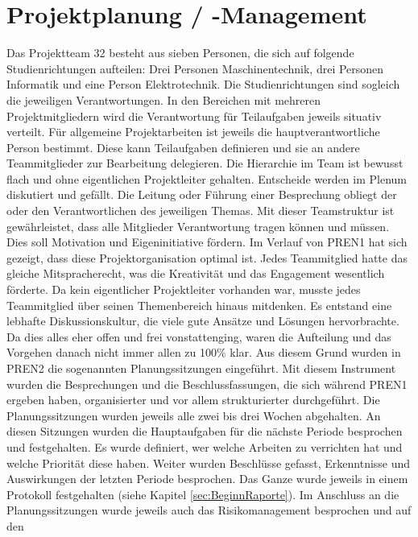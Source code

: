 \section{Projektplanung / -Management}

Das Projektteam 32 besteht aus sieben Personen, die sich auf folgende 
Studienrichtungen aufteilen: Drei Personen Maschinentechnik, drei 
Personen Informatik und eine Person Elektrotechnik. Die Studienrichtungen 
sind sogleich die jeweiligen Verantwortungen. In den Bereichen mit mehreren 
Projektmitgliedern wird die Verantwortung für Teilaufgaben jeweils 
situativ verteilt. Für allgemeine Projektarbeiten ist jeweils die 
hauptverantwortliche Person bestimmt. Diese kann Teilaufgaben definieren 
und sie an andere Teammitglieder zur Bearbeitung delegieren. Die Hierarchie 
im Team ist bewusst flach und ohne eigentlichen Projektleiter gehalten. 
Entscheide werden im Plenum diskutiert und gefällt. Die Leitung oder Führung 
einer Besprechung obliegt der oder den Verantwortlichen des jeweiligen Themas. 
Mit dieser Teamstruktur ist gewährleistet, dass alle Mitglieder Verantwortung 
tragen können und müssen. Dies soll Motivation und Eigeninitiative fördern. 
Im Verlauf von PREN1 hat sich gezeigt, dass diese Projektorganisation optimal 
ist. Jedes Teammitglied hatte das gleiche Mitspracherecht, was die Kreativität 
und das Engagement wesentlich förderte. Da kein eigentlicher Projektleiter 
vorhanden war, musste jedes Teammitglied über seinen Themenbereich hinaus 
mitdenken. Es entstand eine lebhafte Diskussionskultur, die viele gute Ansätze 
und Lösungen hervorbrachte. Da dies alles eher offen und frei vonstattenging, 
waren die Aufteilung und das Vorgehen danach nicht immer allen zu 100\% klar. 
\newline
Aus diesem Grund wurden in PREN2 die sogenannten Planungssitzungen eingeführt. 
Mit diesem Instrument wurden die Besprechungen und die Beschlussfassungen, die 
sich während PREN1 ergeben haben, organisierter und vor allem strukturierter durchgeführt.
Die Planungssitzungen wurden jeweils alle zwei bis drei Wochen abgehalten. An diesen 
Sitzungen wurden die Hauptaufgaben für die nächste Periode besprochen und 
festgehalten. Es wurde definiert, wer welche Arbeiten zu verrichten hat und welche 
Priorität diese haben. Weiter wurden Beschlüsse gefasst, Erkenntnisse und 
Auswirkungen der letzten Periode besprochen. Das Ganze wurde jeweils in einem 
Protokoll festgehalten (siehe Kapitel \ref{sec:BeginnRaporte}). Im Anschluss an 
die Planungssitzungen wurde jeweils auch das Risikomanagement besprochen und auf den 
